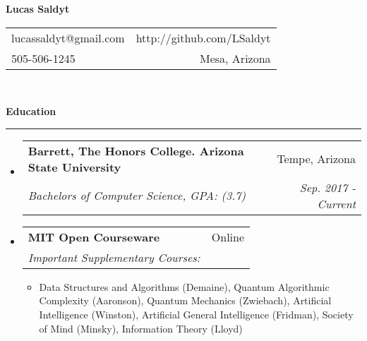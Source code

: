 \documentclass[letterpaper,11pt]{article}
\makeatletter
\newcommand{\sectionline}{
    \noindent\rule[0.5ex]{\linewidth}{0.5pt}
}
\newcommand{\resitem}[1]{\item #1 \vspace{-3pt}}
\newcommand{\resheading}[1]{
    {\large \textbf{#1}}
    \sectionline
}
\newcommand{\colfill}{@{\extracolsep{\fill}}}
\newcommand{\ressubheading}[4]{
\begin{tabular*}{6.5in}{l\colfill r}
		\textbf{#1} & #2 \\
		\textit{#3} & \textit{#4} \\
\end{tabular*}\vspace{-6pt}}
\makeatother
\begin{document}
\begin{center}
\textbf{\Large Lucas Saldyt}
\end{center}
\begin{tabular*}{7in}{l \colfill r}
lucassaldyt@gmail.com & http://github.com/LSaldyt\\
505-506-1245 & Mesa, Arizona \\
\end{tabular*}
\\

\vspace{0.1in}

\resheading{Education}
\begin{itemize}
\item
    \ressubheading{Barrett, The Honors College. Arizona State University}{Tempe, Arizona}{Bachelors of Computer Science, GPA: (3.7)}{Sep. 2017 - Current}
\item
    \ressubheading{MIT Open Courseware}{Online}{Important Supplementary Courses:}{}
	\begin{itemize}
            \resitem{Data Structures and Algorithms (Demaine), Quantum Algorithmic Complexity (Aaronson), Quantum Mechanics (Zwiebach), Artificial Intelligence (Winston), Artificial General Intelligence (Fridman), Society of Mind (Minsky), Information Theory (Lloyd)}
	\end{itemize}

\end{itemize}
\end{document}
